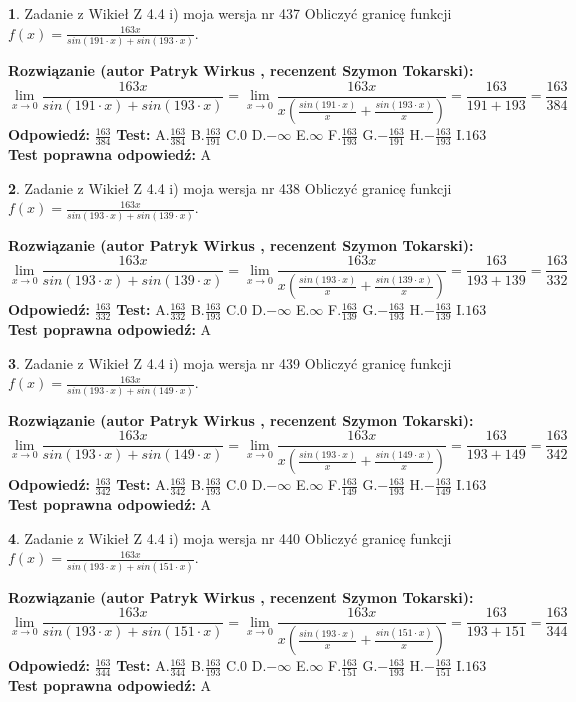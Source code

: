 \documentclass[12pt, a4paper]{article}
\theoremstyle{definition} %
\newtheorem{zad}{}
\newcommand{\zadStart}[1]{\begin{zad}#1\newline}
\newcommand{\zadStop}{\end{zad}}
\newcommand{\rozwStart}[2]{\noindent \textbf{Rozwiązanie (autor #1 , recenzent #2): }\newline}
\newcommand{\rozwStop}{\newline}
\newcommand{\odpStart}{\noindent \textbf{Odpowiedź:}\newline}
\newcommand{\odpStop}{\newline}
\newcommand{\testStart}{\noindent \textbf{Test:}\newline}
\newcommand{\testStop}{\newline}
\newcommand{\kluczStart}{\noindent \textbf{Test poprawna odpowiedź:}\newline}
\newcommand{\kluczStop}{\newline}
\begin{document}
\zadStart{Zadanie z Wikieł Z 4.4 i) moja wersja nr 437}
Obliczyć granicę funkcji $f(x)=\frac{163x}{sin(191\cdot x) +sin(193\cdot x)}$.
\zadStop
\rozwStart{Patryk Wirkus}{Szymon Tokarski}
$$\lim\limits_{x\to 0}\frac{163x}{sin(191\cdot x) +sin(193\cdot x)}=\lim\limits_{x\to 0}\frac{163x}{x(\frac{sin(191\cdot x)}{x}+\frac{sin(193\cdot x)}{x})}=\frac{163}{191+193} = \frac{163}{384}$$
\rozwStop
\odpStart
$\frac{163}{384}$
\odpStop
\testStart
A.$\frac{163}{384}$
B.$\frac{163}{191}$
C.$0$
D.$-\infty$
E.$\infty$
F.$\frac{163}{193}$
G.$-\frac{163}{191}$
H.$-\frac{163}{193}$
I.$163$
\testStop
\kluczStart
A
\kluczStop



\zadStart{Zadanie z Wikieł Z 4.4 i) moja wersja nr 438}
Obliczyć granicę funkcji $f(x)=\frac{163x}{sin(193\cdot x) +sin(139\cdot x)}$.
\zadStop
\rozwStart{Patryk Wirkus}{Szymon Tokarski}
$$\lim\limits_{x\to 0}\frac{163x}{sin(193\cdot x) +sin(139\cdot x)}=\lim\limits_{x\to 0}\frac{163x}{x(\frac{sin(193\cdot x)}{x}+\frac{sin(139\cdot x)}{x})}=\frac{163}{193+139} = \frac{163}{332}$$
\rozwStop
\odpStart
$\frac{163}{332}$
\odpStop
\testStart
A.$\frac{163}{332}$
B.$\frac{163}{193}$
C.$0$
D.$-\infty$
E.$\infty$
F.$\frac{163}{139}$
G.$-\frac{163}{193}$
H.$-\frac{163}{139}$
I.$163$
\testStop
\kluczStart
A
\kluczStop



\zadStart{Zadanie z Wikieł Z 4.4 i) moja wersja nr 439}
Obliczyć granicę funkcji $f(x)=\frac{163x}{sin(193\cdot x) +sin(149\cdot x)}$.
\zadStop
\rozwStart{Patryk Wirkus}{Szymon Tokarski}
$$\lim\limits_{x\to 0}\frac{163x}{sin(193\cdot x) +sin(149\cdot x)}=\lim\limits_{x\to 0}\frac{163x}{x(\frac{sin(193\cdot x)}{x}+\frac{sin(149\cdot x)}{x})}=\frac{163}{193+149} = \frac{163}{342}$$
\rozwStop
\odpStart
$\frac{163}{342}$
\odpStop
\testStart
A.$\frac{163}{342}$
B.$\frac{163}{193}$
C.$0$
D.$-\infty$
E.$\infty$
F.$\frac{163}{149}$
G.$-\frac{163}{193}$
H.$-\frac{163}{149}$
I.$163$
\testStop
\kluczStart
A
\kluczStop



\zadStart{Zadanie z Wikieł Z 4.4 i) moja wersja nr 440}
Obliczyć granicę funkcji $f(x)=\frac{163x}{sin(193\cdot x) +sin(151\cdot x)}$.
\zadStop
\rozwStart{Patryk Wirkus}{Szymon Tokarski}
$$\lim\limits_{x\to 0}\frac{163x}{sin(193\cdot x) +sin(151\cdot x)}=\lim\limits_{x\to 0}\frac{163x}{x(\frac{sin(193\cdot x)}{x}+\frac{sin(151\cdot x)}{x})}=\frac{163}{193+151} = \frac{163}{344}$$
\rozwStop
\odpStart
$\frac{163}{344}$
\odpStop
\testStart
A.$\frac{163}{344}$
B.$\frac{163}{193}$
C.$0$
D.$-\infty$
E.$\infty$
F.$\frac{163}{151}$
G.$-\frac{163}{193}$
H.$-\frac{163}{151}$
I.$163$
\testStop
\kluczStart
A
\kluczStop
\end{document}
